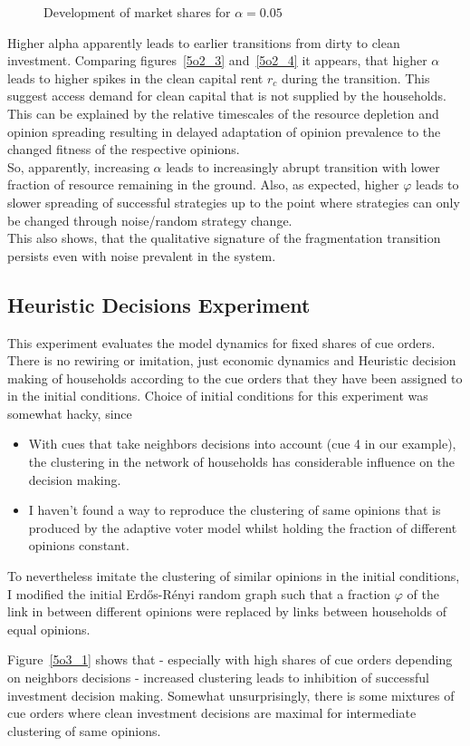 \begin{figure}[t]
	\centering
	\caption{Development of market shares for $\alpha=0.05$}

\end{figure}
Higher alpha apparently leads to earlier transitions from dirty to clean investment.
Comparing figures~\ref{5o2_3} and~\ref{5o2_4} it appears, that higher $\alpha$ leads to higher spikes in the clean capital rent $r_c$ during the transition. This suggest access demand for clean capital that is not supplied by the households. This can be explained by the relative timescales of the resource depletion and opinion spreading resulting in delayed adaptation of opinion prevalence to the changed fitness of the respective opinions.\\
So, apparently, increasing $\alpha$ leads to increasingly abrupt transition with lower fraction of resource remaining in the ground. Also, as expected, higher $\varphi$ leads to slower spreading of successful strategies up to the point where strategies can only be changed through noise/random strategy change. \\
This also shows, that the qualitative signature of the fragmentation transition persists even with noise prevalent in the system.

\subsection{Heuristic Decisions Experiment}

This experiment evaluates the model dynamics for fixed shares of cue orders. There is no rewiring or imitation, just economic dynamics and Heuristic decision making of households according to the cue orders that they have been assigned to in the initial conditions.
Choice of initial conditions for this experiment was somewhat hacky, since 
\begin{itemize}
	\item With cues that take neighbors decisions into account (cue 4 in our example), the clustering in the network of households has considerable influence on the decision making.
	\item I haven't found a way to reproduce the clustering of same opinions that is produced by the adaptive voter model whilst holding the fraction of different opinions constant. 
\end{itemize}
To nevertheless imitate the clustering of similar opinions in the initial conditions, I modified the initial Erd\H{o}s-R\'enyi random graph such that a fraction $\varphi$ of the link in between different opinions were replaced by links between households of equal opinions. 
\par
Figure~\ref{5o3_1} shows that - especially with high shares of cue orders depending on neighbors decisions - increased clustering leads to inhibition of successful investment decision making. Somewhat unsurprisingly, there is some mixtures of cue orders where clean investment decisions are maximal for intermediate clustering of same opinions.
